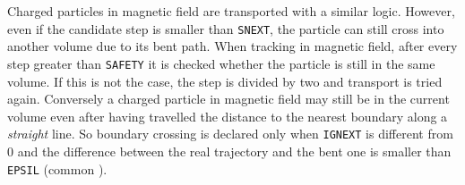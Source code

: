 Charged particles in magnetic field are transported with a similar logic.
However, even if the candidate step is smaller than {\tt SNEXT}, the
particle can still cross into another volume due to its bent path. When
tracking in magnetic field, after every step greater than {\tt SAFETY}
it is checked whether the particle is still in the same volume. If this is
not the case, the step is divided by two and transport is tried again.
Conversely a charged particle in magnetic field may still be in the
current volume even after having travelled the distance to the nearest
boundary along a {\it straight} line. So boundary crossing is declared
only when {\tt IGNEXT} is different from 0 and 
the difference between the real trajectory and the bent one is smaller
than {\tt EPSIL} (common ).

